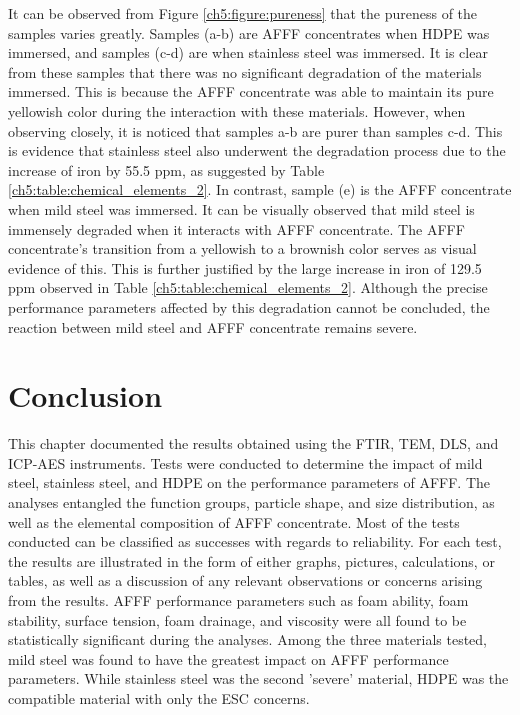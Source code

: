 It can be observed from Figure \ref{ch5:figure:pureness} that the pureness of the samples varies greatly. Samples (a-b) are AFFF concentrates when HDPE was immersed, and samples (c-d) are when stainless steel was immersed. It is clear from these samples that there was no significant degradation of the materials immersed. This is because the AFFF concentrate was able to maintain its pure yellowish color during the interaction with these materials. However, when observing closely, it is noticed that samples a-b are purer than samples c-d. This is evidence that stainless steel also underwent the degradation process due to the increase of iron by 55.5 ppm, as suggested by Table \ref{ch5:table:chemical_elements_2}. In contrast, sample (e) is the AFFF concentrate when mild steel was immersed. It can be visually observed that mild steel is immensely degraded when it interacts with AFFF concentrate. The AFFF concentrate's transition from a yellowish to a brownish color serves as visual evidence of this. This is further justified by the large increase in iron of 129.5 ppm observed in Table \ref{ch5:table:chemical_elements_2}. Although the precise performance parameters affected by this degradation cannot be concluded, the reaction between mild steel and AFFF concentrate remains severe.

\section{Conclusion}
This chapter documented the results obtained using the FTIR, TEM, DLS, and ICP-AES instruments. Tests were conducted to determine the impact of mild steel, stainless steel, and HDPE on the performance parameters of AFFF. The analyses entangled the function groups, particle shape, and size distribution, as well as the elemental composition of AFFF concentrate. Most of the tests conducted can be classified as successes with regards to reliability. For each test, the results are illustrated in the form of either graphs, pictures, calculations, or tables, as well as a discussion of any relevant observations or concerns arising from the results. AFFF performance parameters such as foam ability, foam stability, surface tension, foam drainage, and viscosity were all found to be statistically significant during the analyses. Among the three materials tested, mild steel was found to have the greatest impact on AFFF performance parameters. While stainless steel was the second 'severe' material, HDPE was the compatible material with only the ESC concerns.
